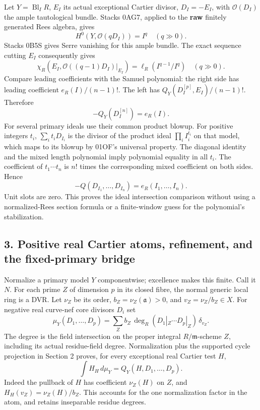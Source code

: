 \documentclass[
]{article}
\begin{document}
Let \(Y=\operatorname{Bl}_I R\), \(E_I\) its actual exceptional Cartier
divisor, \(D_I=-E_I\), with \(\mathcal O(D_I)\) the ample tautological
bundle. Stacks 0AG7, applied to the \textbf{raw} finitely generated Rees
algebra, gives \[H^0(Y,\mathcal O(qD_I))=I^q\quad(q\gg0).\] Stacks 0B5S
gives Serre vanishing for this ample bundle. The exact sequence cutting
\(E_I\) consequently gives
\[\chi_R(E_I,\mathcal O((q-1)D_I)|_{E_I})=\ell_R(I^{q-1}/I^q)\quad(q\gg0).\]
Compare leading coefficients with the Samuel polynomial: the right side
has leading coefficient \(e_R(I)/(n-1)!\). The left has
\(Q_Y(D_I^{[p]},E_I)/(n-1)!\). Therefore \[-Q_Y(D_I^{[n]})=e_R(I).\] For
several primary ideals use their common product blowup. For positive
integers \(t_i\), \(\sum_i t_iD_{I_i}\) is the divisor of the product
ideal \(\prod_i I_i^{t_i}\) on that model, which maps to its blowup by
01OF's universal property. The diagonal identity and the mixed length
polynomial imply polynomial equality in all \(t_i\). The coefficient of
\(t_1\cdots t_n\) is \(n!\) times the corresponding mixed coefficient on
both sides. Hence \[-Q(D_{I_1},\ldots,D_{I_n})=e_R(I_1,\ldots,I_n).\]
Unit slots are zero. This proves the ideal intersection comparison
without using a normalized-Rees section formula or a finite-window guess
for the polynomial's stabilization.

\subsection{3. Positive real Cartier atoms, refinement, and the
fixed-primary
bridge}\label{positive-real-cartier-atoms-refinement-and-the-fixed-primary-bridge}

Normalize a primary model \(Y\) componentwise; excellence makes this
finite. Call it \(N\). For each prime \(Z\) of dimension \(p\) in its
closed fibre, the normal generic local ring is a DVR. Let \(\nu_Z\) be
its order, \(b_Z=\nu_Z(\mathfrak a)>0\), and \(v_Z=\nu_Z/b_Z\in X\). For
negative real curve-nef core divisors \(D_i\) set
\[\mu_Y(D_1,\ldots,D_p)=\sum_Z b_Z\,\deg_R(D_1|_Z\cdots D_p|_Z)\,\delta_{v_Z}.\]
The degree is the field intersection on the proper integral
\(R/\mathfrak m\)-scheme \(Z\), including its actual residue-field
degree. Normalization plus the supported cycle projection in Section 2
proves, for every exceptional real Cartier test \(H\),
\[\int H_H\,d\mu_Y=Q_Y(H,D_1,\ldots,D_p).\] Indeed the pullback of \(H\)
has coefficient \(\nu_Z(H)\) on \(Z\), and \(H_H(v_Z)=\nu_Z(H)/b_Z\).
This accounts for the one normalization factor in the atom, and retains
inseparable residue degrees.
\end{document}
